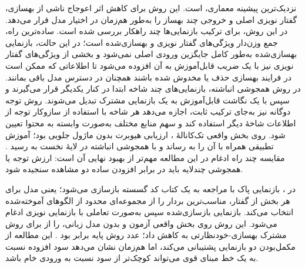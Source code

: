 نزدیک‌ترین پیشینه معماری،  است. این روش برای کاهش اثر اعوجاج ناشی از بهسازی، گفتار نویزی اصلی و خروجی چند بهساز را به‌طور هم‌زمان در اختیار مدل قرار می‌دهد. در این روش، برای ترکیب بازنمایی‌ها چند راهکار بررسی شده است. ساده‌ترین راه، جمع وزن‌دار ویژگی‌های گفتار نویزی و بهسازی‌شده است؛ در این حالت، بازنمایی بهسازی‌شده به‌طور کامل جایگزین ورودی اصلی نمی‌شود و بخشی از ویژگی‌های گفتار نویزی نیز با یک ضریب قابل‌آموزش به آن افزوده می‌شود تا اطلاعاتی که ممکن است در فرایند بهسازی حذف یا مخدوش شده باشند همچنان در دسترس مدل باقی بمانند. در روش همجوشی انباشته، بازنمایی‌های چند شاخه ابتدا در کنار یکدیگر قرار می‌گیرند و سپس با یک نگاشت قابل‌آموزش به یک بازنمایی مشترک تبدیل می‌شوند. روش توجه دوگانه نیز به‌جای ترکیب ثابت، اجازه می‌دهد هر شاخه با استفاده از سازوکار توجه از اطلاعات شاخهٔ دیگر استفاده کند و سهم منابع مختلف به‌صورت وابسته به محتوا تعیین شود. روی بخش واقعی تک‌کانالهٔ ،  ارزیابی هیوبرت بدون ماژول جلویی  بود؛ آموزش تطبیقی همراه با  آن را به  رساند و با همجوشی انباشته در لایهٔ نخست به  رسید . مقایسه چند راه ادغام در این مطالعه مهم‌تر از بهبود نهایی آن است: ارزش توجه یا همجوشی چندلایه باید در برابر افزودن ساده دو مشاهده سنجیده شود.

در ، بازنمایی پاک با مراجعه به یک کتاب کد گسسته بازسازی می‌شود؛ یعنی مدل برای هر بخش از گفتار، مناسب‌ترین بردار را از مجموعه‌ای محدود از الگوهای آموخته‌شده انتخاب می‌کند. بازنمایی بازسازی‌شده سپس به‌صورت تعاملی با بازنمایی نویزی ادغام می‌شود. این روش روی بخش واقعی آزمون  و بدون مدل زبانی،  را از  برای روش مشترک بهسازی-خودنظارتی به  کاهش داد؛ عدد روش پایه  برابر  بود . این مطالعه از مکمل‌بودن دو بازنمایی پشتیبانی می‌کند، اما هم‌زمان نشان می‌دهد سود افزوده نسبت به یک خط مبنای قوی می‌تواند کوچک‌تر از سود نسبت به ورودی خام باشد.

